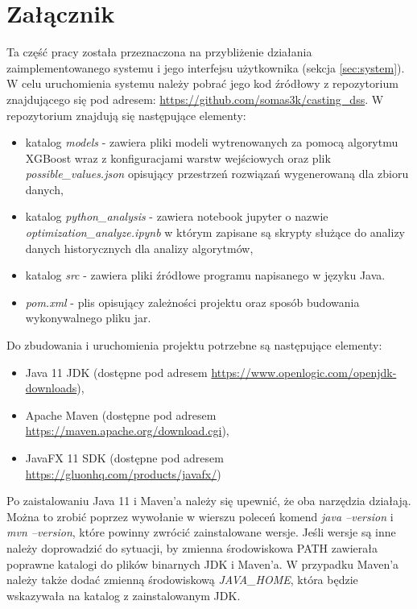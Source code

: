 \captionsetup{list=no}
\chapter*{Załącznik}\label{sec:zalacznik}
Ta część pracy została przeznaczona na przybliżenie działania zaimplementowanego systemu i jego interfejsu użytkownika (sekcja \ref{sec:system}). W celu uruchomienia systemu należy pobrać jego kod źródłowy z repozytorium znajdującego się pod adresem: \url{https://github.com/somas3k/casting_dss}. 
W repozytorium znajdują się następujące elementy:
\begin{itemize}
    \item katalog \textit{models} - zawiera pliki modeli wytrenowanych za pomocą algorytmu XGBoost wraz z konfiguracjami warstw wejściowych oraz plik \textit{possible\_values.json} opisujący przestrzeń rozwiązań wygenerowaną dla zbioru danych,
    \item katalog \textit{python\_analysis} - zawiera notebook jupyter o nazwie \textit{optimization\_analyze.ipynb} w którym zapisane są skrypty służące do analizy danych historycznych dla analizy algorytmów,
    \item katalog \textit{src} - zawiera pliki źródłowe programu napisanego w języku Java.
    \item \textit{pom.xml} - plis opisujący zależności projektu oraz sposób budowania wykonywalnego pliku jar.
\end{itemize}

Do zbudowania i uruchomienia projektu potrzebne są następujące elementy:
\begin{itemize}
    \item Java 11 JDK (dostępne pod adresem \url{https://www.openlogic.com/openjdk-downloads}),
    \item Apache Maven (dostępne pod adresem \url{https://maven.apache.org/download.cgi}),
    \item JavaFX 11 SDK (dostępne pod adresem \url{https://gluonhq.com/products/javafx/})
\end{itemize}

Po zaistalowaniu Java 11 i Maven'a należy się upewnić, że oba narzędzia działają. Można to zrobić poprzez wywołanie w wierszu poleceń komend \textit{java --version} i \textit{mvn --version}, które powinny zwrócić zainstalowane wersje. Jeśli wersje są inne należy doprowadzić do sytuacji, by zmienna środowiskowa PATH zawierała poprawne katalogi do plików binarnych JDK i Maven'a. W przypadku Maven'a należy także dodać zmienną środowiskową \textit{JAVA\_HOME}, która będzie wskazywała na katalog z zainstalowanym JDK.

